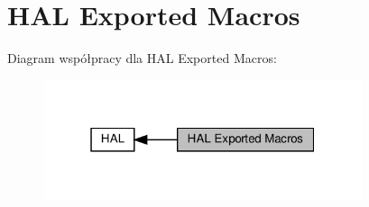 \hypertarget{group___h_a_l___exported___macros}{}\section{H\+AL Exported Macros}
\label{group___h_a_l___exported___macros}
Diagram współpracy dla H\+AL Exported Macros\+:\nopagebreak
\begin{figure}[H]
\begin{center}
\leavevmode
\includegraphics[width=265pt]{group___h_a_l___exported___macros}
\end{center}
\end{figure}
